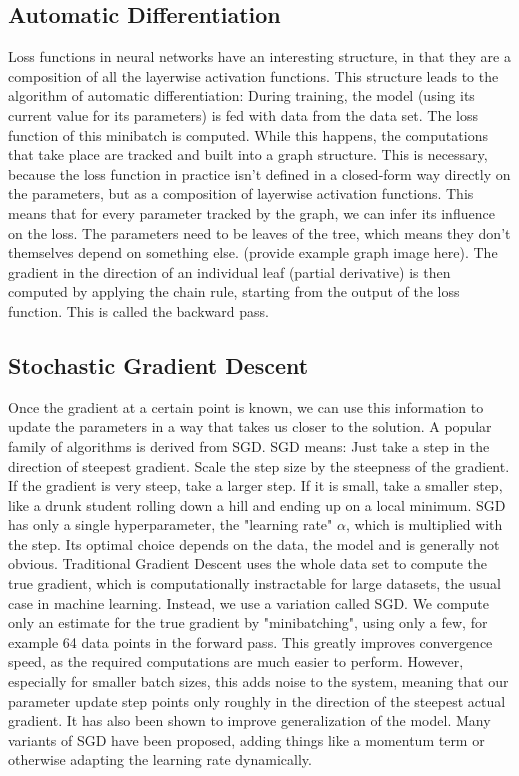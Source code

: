 \documentclass[twoside,12pt,a4paper]{report}
\begin{document}
\subsection{Automatic Differentiation}
Loss functions in neural networks have an interesting structure, in that they are a composition of all the layerwise activation functions. This structure leads to the algorithm of automatic differentiation:
During training, the model (using its current value for its parameters) is fed with data from the data set. The loss function of this minibatch is computed. While this happens, the computations that take place are tracked and built into a graph structure. This is necessary, because the loss function in practice isn't defined in a closed-form way directly on the parameters, but as a composition of layerwise activation functions. This means that for every parameter tracked by the graph, we can infer its influence on the loss. The parameters need to be leaves of the tree, which means they don't themselves depend on something else. (provide example graph image here).
The gradient in the direction of an individual leaf (partial derivative) is then computed by applying the chain rule, starting from the output of the loss function. This is called the backward pass.

\subsection{Stochastic Gradient Descent}
Once the gradient at a certain point is known, we can use this information to update the parameters in a way that takes us closer to the solution. A popular family of algorithms is derived from SGD. SGD means: Just take a step in the direction of steepest gradient. Scale the step size by the steepness of the gradient. If the gradient is very steep, take a larger step. If it is small, take a smaller step, like a drunk student rolling down a hill and ending up on a local minimum.
SGD has only a single hyperparameter, the "learning rate" $\alpha$, which is multiplied with the step. Its optimal choice depends on the data, the model and is generally not obvious.
Traditional Gradient Descent uses the whole data set to compute the true gradient, which is computationally instractable for large datasets, the usual case in machine learning. Instead, we use a variation called SGD. We compute only an estimate for the true gradient by "minibatching", using only a few, for example 64 data points in the forward pass. This greatly improves convergence speed, as the required computations are much easier to perform. However, especially for smaller batch sizes, this adds noise to the system, meaning that our parameter update step points only roughly in the direction of the steepest actual gradient. It has also been shown to improve generalization of the model.
Many variants of SGD have been proposed, adding things like a momentum term or otherwise adapting the learning rate dynamically.
\end{document}
